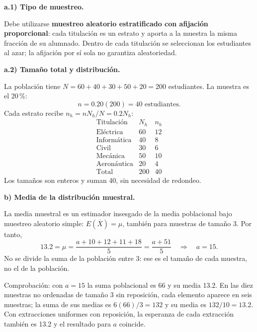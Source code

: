 \textbf{a.1) Tipo de muestreo.}\par\nopagebreak[4]
Debe utilizarse \textbf{muestreo aleatorio estratificado con afijación proporcional}: cada titulación es un estrato y aporta a la muestra la misma fracción de su alumnado. Dentro de cada titulación se seleccionan los estudiantes al azar; la afijación por sí sola no garantiza aleatoriedad.

\textbf{a.2) Tamaño total y distribución.}\par\nopagebreak[4]
La población tiene $N=60+40+30+50+20=200$ estudiantes. La muestra es el 20\,\%:
\[
\boxed{n=0.20(200)=40\text{ estudiantes}.}
\]
Cada estrato recibe $n_h=nN_h/N=0.2N_h$:
\[
\begin{array}{c|r|r}
\text{Titulación}&N_h&n_h\\\hline
\text{Eléctrica}&60&12\\
\text{Informática}&40&8\\
\text{Civil}&30&6\\
\text{Mecánica}&50&10\\
\text{Aeronáutica}&20&4\\\hline
\text{Total}&200&40
\end{array}
\]
Los tamaños son enteros y suman 40, sin necesidad de redondeo.

\textbf{b) Media de la distribución muestral.}\par\nopagebreak[4]
La media muestral es un estimador insesgado de la media poblacional bajo muestreo aleatorio simple: $E(\overline X)=\mu$, también para muestras de tamaño 3. Por tanto,
\[
13.2=\mu=\frac{a+10+12+11+18}{5}=\frac{a+51}{5}
\quad\Longrightarrow\quad\boxed{a=15}.
\]
No se divide la suma de la población entre 3: ese es el tamaño de cada muestra, no el de la población.

Comprobación: con $a=15$ la suma poblacional es 66 y su media 13.2. En las diez muestras no ordenadas de tamaño 3 sin reposición, cada elemento aparece en seis muestras; la suma de sus medias es $6(66)/3=132$ y su media es $132/10=13.2$. Con extracciones uniformes con reposición, la esperanza de cada extracción también es 13.2 y el resultado para $a$ coincide.

